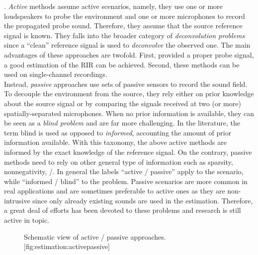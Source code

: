 .
\textit{Active} methods assume active scenarios, namely, they use one or more loudspeakers to probe the environment and one or more microphones to record the propagated probe sound.
Therefore, they assume that the source reference signal is known.
They falls into the broader category of \textit{deconvolution problems} since a ``clean'' reference signal is used to \textit{deconvolve} the observed one.
The main advantages of these approaches are twofold.
First, provided a proper probe signal, a good estimation of the \ac{RIR} can be achieved.
Second, these methods can be used on single-channel recordings.
\\Instead, \textit{passive} approaches use sets of passive sensors to record the sound field.
To decouple the environment from the source, they rely either on prior knowledge about the source signal or by comparing the signals received at two (or more) spatially-separated microphones.
When no prior information is available, they can be seen as a \textit{blind problem} and are far more challenging.
In the literature, the term blind is used as opposed to \textit{informed}, accounting the amount of prior information available.
With this taxonomy, the above active methods are informed by the exact knowledge of the reference signal.
On the contrary, passive methods need to rely on other general type of information such as sparsity, nonnegativity, \etc/.
In general the labels ``active \vs/ passive'' apply to the scenario, while ``informed \vs/ blind'' to the problem.
Passive scenarios are more common in real applications and are sometimes preferable to active ones as they are non-intrusive since only already existing sounds are used in the estimation.
Therefore, a great deal of efforts has been devoted to these problems and research is still active in topic.

\begin{figure}[h]
    \begin{sidecaption}{%
        Schematic view of active \vs/ passive approaches.
    }[fig:estimation:activepassive]
    \centering
    \resizebox{\linewidth}{!}{
        
    }
    \end{sidecaption}
\end{figure}

